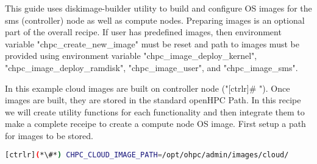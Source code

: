 

   This guide uses diskimage-builder utility to build and configure OS images 
for the sms (controller) node as well as compute nodes.  Preparing images is 
an optional part of the overall recipe. If user has predefined images, then 
environment variable "chpc\_create\_new\_image" must be reset and 
path to images must be provided using environment variable "chpc\_image\_deploy\_kernel", "chpc\_image\_deploy\_ramdisk",
"chpc\_image\_user", and "chpc\_image\_sms". 

In this example cloud images are built on controller node ("[ctrlr]\# "). Once images are built, they are stored in the standard openHPC Path.
In this recipe we will create utility functions for each functionality and then integrate them to make a complete receipe to create a compute node OS image. First setup a path for images to be stored.

\begin{lstlisting}[language=bash,keywords={},upquote=true]
[ctrlr](*\#*) CHPC_CLOUD_IMAGE_PATH=/opt/ohpc/admin/images/cloud/
\end{lstlisting}


